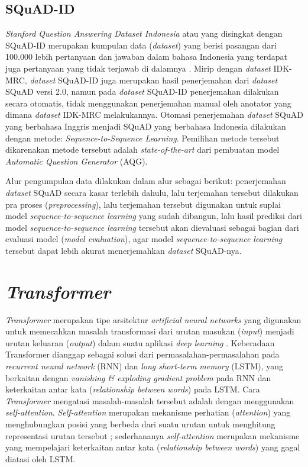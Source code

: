 \subsection{SQuAD-ID}
\emph{Stanford Question Answering Dataset Indonesia} atau yang disingkat dengan SQuAD-ID merupakan kumpulan data (\emph{dataset}) yang berisi pasangan dari 100.000 lebih pertanyaan dan jawaban dalam bahasa Indonesia yang terdapat juga pertanyaan yang tidak terjawab di dalamnya \citep{muis2020sequencetosequence}. Mirip dengan \emph{dataset} IDK-MRC, \emph{dataset} SQuAD-ID juga merupakan hasil penerjemahan dari \emph{dataset} SQuAD versi 2.0, namun pada \emph{dataset} SQuAD-ID penerjemahan dilakukan secara otomatis, tidak menggunakan penerjemahan manual oleh anotator yang dimana \emph{dataset} IDK-MRC melakukannya. Otomasi penerjemahan \emph{dataset} SQuAD yang berbahasa Inggris menjadi SQuAD yang berbahasa Indonesia dilakukan dengan metode: \emph{Sequence-to-Sequence Learning}. Pemilihan metode tersebut dikarenakan metode tersebut adalah \emph{state-of-the-art} dari pembuatan model \emph{Automatic Question Generator} (AQG). 

Alur pengumpulan data dilakukan dalam alur sebagai berikut: penerjemahan \emph{dataset} SQuAD secara kasar terlebih dahulu, lalu terjemahan tersebut dilakukan pra proses (\emph{preprocessing}), lalu terjemahan tersebut digunakan untuk suplai model \emph{sequence-to-sequence learning} yang sudah dibangun, lalu hasil prediksi dari model \emph{sequence-to-sequence learning} tersebut akan dievaluasi sebagai bagian dari evaluasi model (\emph{model evaluation}), agar model \emph{sequence-to-sequence learning} tersebut dapat lebih akurat menerjemahkan \emph{dataset} SQuAD-nya.

\section{\emph{Transformer}}
\emph{Transformer} merupakan tipe arsitektur \emph{artificial neural networks} yang digunakan untuk memecahkan masalah transformasi dari urutan masukan (\emph{input}) menjadi urutan keluaran (\emph{output}) dalam suatu aplikasi \emph{deep learning} \citep{transformers-self-attention-to-the-rescue}. Keberadaan Transformer dianggap sebagai solusi dari permasalahan-permasalahan pada \emph{recurrent neural network} (RNN) dan \emph{long short-term memory} (LSTM), yang berkaitan dengan \emph{vanishing \& exploding gradient problem} pada RNN dan keterkaitan antar kata (\emph{relationship between words}) pada LSTM. Cara \emph{Transformer} mengatasi masalah-masalah tersebut adalah dengan menggunakan \emph{self-attention}. \emph{Self-attention} merupakan mekanisme perhatian (\emph{attention}) yang menghubungkan posisi yang berbeda dari suatu urutan untuk menghitung representasi urutan tersebut \citep{DBLP:journals/corr/VaswaniSPUJGKP17}; sederhananya \emph{self-attention} merupakan mekanisme yang mempelajari keterkaitan antar kata (\emph{relationship between words}) yang gagal diatasi oleh LSTM. 


